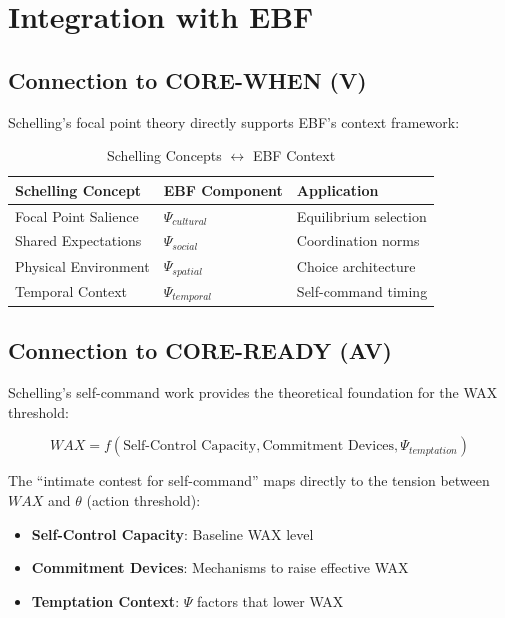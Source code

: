 \section{Integration with EBF}
\label{sec:ts-integration}

\subsection{Connection to CORE-WHEN (V)}

Schelling's focal point theory directly supports EBF's context framework:

\begin{table}[htbp]
\centering
\caption{Schelling Concepts $\leftrightarrow$ EBF Context}
\label{tab:ts-psi}
\renewcommand{\arraystretch}{1.3}
\begin{tabular}{@{}lll@{}}
\toprule
\textbf{Schelling Concept} & \textbf{EBF Component} & \textbf{Application} \\
\midrule
Focal Point Salience & $\Psi_{cultural}$ & Equilibrium selection \\
Shared Expectations & $\Psi_{social}$ & Coordination norms \\
Physical Environment & $\Psi_{spatial}$ & Choice architecture \\
Temporal Context & $\Psi_{temporal}$ & Self-command timing \\
\bottomrule
\end{tabular}
\end{table}

\subsection{Connection to CORE-READY (AV)}

Schelling's self-command work provides the theoretical foundation for the
WAX threshold:

\begin{equation}
WAX = f(\text{Self-Control Capacity}, \text{Commitment Devices}, \Psi_{temptation})
\label{eq:ts-wax}
\end{equation}

The ``intimate contest for self-command'' maps directly to the tension between
$WAX$ and $\theta$ (action threshold):
\begin{itemize}
\item \textbf{Self-Control Capacity}: Baseline WAX level
\item \textbf{Commitment Devices}: Mechanisms to raise effective WAX
\item \textbf{Temptation Context}: $\Psi$ factors that lower WAX
\end{itemize}

